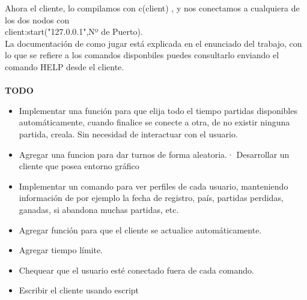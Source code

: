 \documentclass{article}
\begin{document}
Ahora el cliente, lo compilamos con c(client) , y nos conectamos a cualquiera de los
dos nodos con \\ 
client:start("127.0.0.1",Nº de Puerto). \\
La documentación de como jugar está explicada en el enunciado del trabajo, con lo que
se refiere a los comandos disponbiles puedes consultarlo enviando el comando HELP
desde el cliente. \\ \\
{\large \textbf{TODO}}
\begin{itemize} 
  \item Implementar una función para que elija todo el tiempo partidas disponibles
automáticamente, cuando finalice se conecte a otra, de no existir ninguna partida,
creala. Sin necesidad de interactuar con el usuario.
	\item Agregar una funcion para dar turnos de forma aleatoria.· Desarrollar un cliente que posea entorno gráfico
	\item Implementar un comando para ver perfiles de cada usuario, manteniendo información
de por ejemplo la fecha de registro, país, partidas perdidas, ganadas, si abandona
muchas partidas, etc.
	\item Agregar función para que el cliente se actualice automáticamente.
  \item Agregar tiempo límite.
  \item Chequear que el usuario esté conectado fuera de cada comando.
  \item Escribir el cliente usando escript
\end{itemize}
\end{document}
